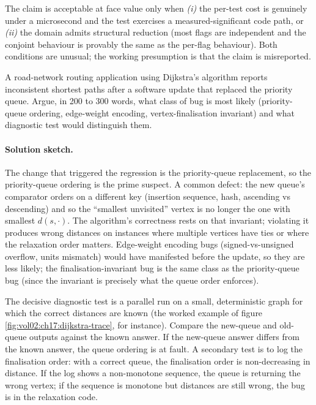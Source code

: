 The claim is acceptable at face value only when \textit{(i)} the
per-test cost is genuinely under a microsecond and the test
exercises a measured-significant code path, or \textit{(ii)} the
domain admits structural reduction (most flags are independent and
the conjoint behaviour is provably the same as the per-flag
behaviour). Both conditions are unusual; the working presumption
is that the claim is misreported.

\begin{exercise}
A road-network routing application using Dijkstra's algorithm
reports inconsistent shortest paths after a software update that
replaced the priority queue. Argue, in 200 to 300 words, what class
of bug is most likely (priority-queue ordering, edge-weight
encoding, vertex-finalisation invariant) and what diagnostic test
would distinguish them.
\end{exercise}

\paragraph{Solution sketch.}
The change that triggered the regression is the priority-queue
replacement, so the priority-queue ordering is the prime suspect.
A common defect: the new queue's comparator orders on a different
key (insertion sequence, hash, ascending vs descending) and so the
``smallest unvisited'' vertex is no longer the one with smallest
$d(s, \cdot)$. The algorithm's correctness rests on that
invariant; violating it produces wrong distances on instances
where multiple vertices have ties or where the relaxation order
matters. Edge-weight encoding bugs (signed-vs-unsigned overflow,
units mismatch) would have manifested before the update, so they
are less likely; the finalisation-invariant bug is the same class
as the priority-queue bug (since the invariant is precisely what
the queue order enforces).

The decisive diagnostic test is a parallel run on a small,
deterministic graph for which the correct distances are known
(the worked example of figure
\ref{fig:vol02:ch17:dijkstra-trace}, for instance). Compare the
new-queue and old-queue outputs against the known answer. If the
new-queue answer differs from the known answer, the queue
ordering is at fault. A secondary test is to log the
finalisation order: with a correct queue, the finalisation order
is non-decreasing in distance. If the log shows a non-monotone
sequence, the queue is returning the wrong vertex; if the
sequence is monotone but distances are still wrong, the bug is in
the relaxation code.

